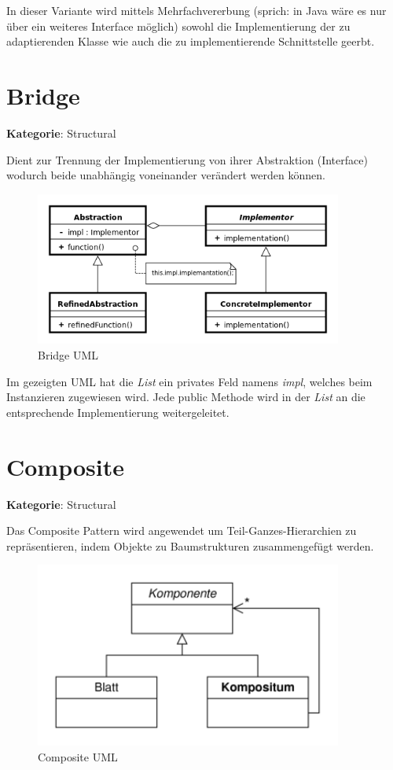 In dieser Variante wird mittels Mehrfachvererbung (sprich: in Java wäre es nur über ein weiteres Interface möglich) sowohl die Implementierung der zu adaptierenden Klasse wie auch die zu implementierende Schnittstelle geerbt.

\section{Bridge}
\textbf{Kategorie}: Structural

Dient zur Trennung der Implementierung von ihrer Abstraktion (Interface) wodurch beide unabhängig voneinander verändert werden können.

\begin{figure}[H]
	\centering
	\includegraphics[width=0.9\textwidth]{content/gof/images/06-bridge-uml.png}
	\caption{Bridge UML}
\end{figure}

Im gezeigten UML hat die \textit{List} ein privates Feld namens \textit{impl}, welches beim Instanzieren zugewiesen wird. Jede public Methode wird in der \textit{List} an die entsprechende Implementierung weitergeleitet.

\section{Composite}
\textbf{Kategorie}: Structural

Das Composite Pattern wird angewendet um Teil-Ganzes-Hierarchien zu repräsentieren, indem Objekte zu Baumstrukturen zusammengefügt werden.

\begin{figure}[H]
	\centering
	\includegraphics[width=0.9\textwidth]{content/gof/images/07-composite-uml.png}
	\caption{Composite UML}
\end{figure}


